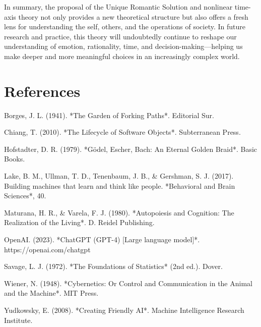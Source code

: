 \documentclass[
]{article}
\begin{document}
In summary, the proposal of the Unique Romantic Solution and nonlinear
time-axis theory not only provides a new theoretical structure but also
offers a fresh lens for understanding the self, others, and the
operations of society. In future research and practice, this theory will
undoubtedly continue to reshape our understanding of emotion,
rationality, time, and decision-making---helping us make deeper and more
meaningful choices in an increasingly complex world.

\hypertarget{references}{%
\section{References}\label{references}}

Borges, J. L. (1941). *The Garden of Forking Paths*. Editorial Sur.

Chiang, T. (2010). *The Lifecycle of Software Objects*. Subterranean
Press.

Hofstadter, D. R. (1979). *Gödel, Escher, Bach: An Eternal Golden
Braid*. Basic Books.

Lake, B. M., Ullman, T. D., Tenenbaum, J. B., \& Gershman, S. J. (2017).
Building machines that learn and think like people. *Behavioral and
Brain Sciences*, 40.

Maturana, H. R., \& Varela, F. J. (1980). *Autopoiesis and Cognition:
The Realization of the Living*. D. Reidel Publishing.

OpenAI. (2023). *ChatGPT (GPT-4) {[}Large language model{]}*.
https://openai.com/chatgpt

Savage, L. J. (1972). *The Foundations of Statistics* (2nd ed.). Dover.

Wiener, N. (1948). *Cybernetics: Or Control and Communication in the
Animal and the Machine*. MIT Press.

Yudkowsky, E. (2008). *Creating Friendly AI*. Machine Intelligence
Research Institute.
\end{document}
